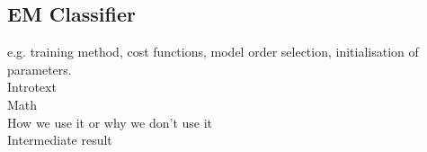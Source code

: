 \subsection{EM Classifier}
\label{sec:EMGMM}
e.g. training method, cost functions, model order selection, initialisation of parameters.\\

Introtext\\

Math\\

How we use it or why we don't use it\\

Intermediate result\\


